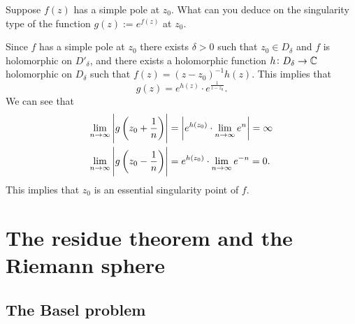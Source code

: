 \documentclass[11pt,a4paper]{article}
\begin{document}
\begin{exercise}
  Suppose $f(z)$ has a simple pole at $z_0$.
  What can you deduce on the singularity type of the function
  $g(z) := e^{f(z)}$ at $z_0$.
\end{exercise}
\begin{solution}
  Since $f$ has a simple pole at $z_0$ there exists $\delta > 0$
  such that $z_0 \in D_{\delta}$ and $f$ is holomorphic on $D'_{\delta}$,
  and there exists a holomorphic function $h \colon D_{\delta} \to \mathbb{C}$
  holomorphic on $D_{\delta}$ such that $f(z) = (z - z_0)^{-1} h(z)$.
  This implies that
  \[
    g(z) =
    e^{h(z)} \cdot e^{\frac{1}{z - z_0}}.
  \]
  We can see that
  \begin{align*}
    \lim_{n \to \infty} \abs{g\del{z_0 + \frac{1}{n}}} &=
    \abs{e^{h(z_0)} \cdot \lim_{n \to \infty} e^{n}} = \infty \\
    \lim_{n \to \infty} \abs{g\del{z_0 - \frac{1}{n}}} &=
    e^{h(z_0)} \cdot \lim_{n \to \infty} e^{-n} = 0.
  \end{align*}
  This implies that $z_0$ is an essential singularity point of $f$.
\end{solution}

\newpage
\section{The residue theorem and the Riemann sphere}

\subsection{The Basel problem}
\end{document}
